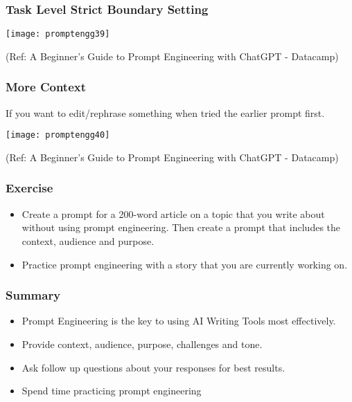 \begin{frame}[fragile]\frametitle{Task Level Strict Boundary Setting}


\begin{center}
\texttt{[image: promptengg39]}

{\tiny (Ref: A Beginner's Guide to Prompt Engineering with ChatGPT - Datacamp)}
\end{center}		
		

\end{frame}

\begin{frame}[fragile]\frametitle{More Context}

If you want to edit/rephrase something when tried the earlier prompt first.

\begin{center}
\texttt{[image: promptengg40]}

{\tiny (Ref: A Beginner's Guide to Prompt Engineering with ChatGPT - Datacamp)}
\end{center}		
		

\end{frame}


\begin{frame}[fragile]\frametitle{Exercise}

\begin{itemize}
\item Create a prompt for a 200-word article on a topic that you write about without using prompt engineering. Then create a prompt that includes the context, audience and purpose. 
\item Practice prompt engineering with a story that you are currently working on.
\end{itemize}	 

\end{frame}

\begin{frame}[fragile]\frametitle{Summary}

\begin{itemize}
\item Prompt Engineering is the key to using AI Writing Tools most
effectively.
\item Provide context, audience, purpose, challenges and tone.
\item Ask follow up questions about your responses for best results.
\item Spend time practicing prompt engineering
\end{itemize}	 

\end{frame}